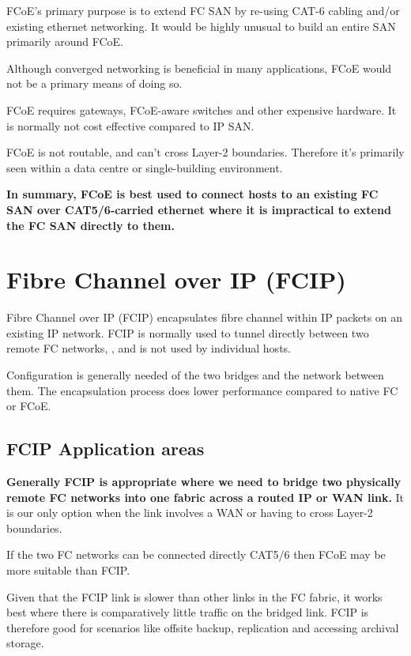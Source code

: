 FCoE's primary purpose is to extend FC SAN by re-using CAT-6 cabling
and/or existing ethernet networking. It would be highly unusual to build
an entire SAN primarily around FCoE.

Although converged networking is beneficial in many applications, FCoE
would not be a primary means of doing so.

FCoE requires gateways, FCoE-aware switches and other expensive
hardware. It is normally not cost effective compared to IP SAN.

FCoE is not routable, and can't cross Layer-2 boundaries. Therefore it's
primarily seen within a data centre or single-building environment.

\textbf{In summary, FCoE is best used to connect hosts to an existing FC
SAN over CAT5/6-carried ethernet where it is impractical to extend the
FC SAN directly to them.}

\section{Fibre Channel over IP (FCIP)}
\label{sec:fibre-channel-over-ip}

Fibre Channel over IP (FCIP) encapsulates fibre channel within IP
packets on an existing IP network. FCIP is normally used to tunnel
directly between two remote FC networks, , and is not used by individual
hosts.


Configuration is generally needed of the two bridges and the network
between them. The encapsulation process does lower performance compared
to native FC or FCoE.

\subsection{FCIP Application areas}
\label{sec:fcip-application-areas}

\textbf{Generally FCIP is appropriate where we need to bridge two
physically remote FC networks into one fabric across a routed IP or WAN
link.} It is our only option when the link involves a WAN or having to
cross Layer-2 boundaries.

If the two FC networks can be connected directly CAT5/6 then FCoE may be
more suitable than FCIP.

Given that the FCIP link is slower than other links in the FC fabric, it
works best where there is comparatively little traffic on the bridged
link. FCIP is therefore good for scenarios like offsite backup,
replication and accessing archival storage.

